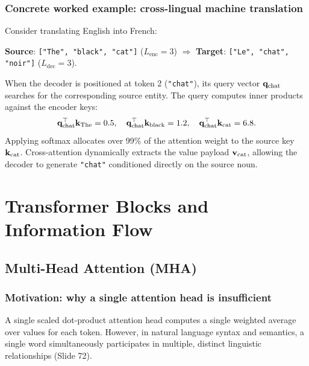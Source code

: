 \documentclass[../../../main.tex]{subfiles}
\begin{document}
\subsubsection{Concrete worked example: cross-lingual machine translation}
Consider translating English into French:
\begin{center}
\textbf{Source}: \texttt{["The", "black", "cat"]} ($L_{\text{enc}} = 3$) \quad $\Longrightarrow$ \quad \textbf{Target}: \texttt{["Le", "chat", "noir"]} ($L_{\text{dec}} = 3$).
\end{center}
When the decoder is positioned at token 2 (\texttt{"chat"}), its query vector $\mathbf{q}_{\text{chat}}$ searches for the corresponding source entity. The query computes inner products against the encoder keys:
\begin{equation}
\mathbf{q}_{\text{chat}}^\top \mathbf{k}_{\text{The}} = 0.5, \quad \mathbf{q}_{\text{chat}}^\top \mathbf{k}_{\text{black}} = 1.2, \quad \mathbf{q}_{\text{chat}}^\top \mathbf{k}_{\text{cat}} = 6.8.
\end{equation}
Applying softmax allocates over 99\% of the attention weight to the source key $\mathbf{k}_{\text{cat}}$. Cross-attention dynamically extracts the value payload $\mathbf{v}_{\text{cat}}$, allowing the decoder to generate \texttt{"chat"} conditioned directly on the source noun.

\clearpage
\section{Transformer Blocks and Information Flow}
\label{sec:transformer_core_blocks_journey}

\subsection{Multi-Head Attention (MHA)}
\label{subsec:multi_head_attention_deep}

\subsubsection{Motivation: why a single attention head is insufficient}
A single scaled dot-product attention head computes a single weighted average over values for each token. However, in natural language syntax and semantics, a single word simultaneously participates in multiple, distinct linguistic relationships (Slide 72).
\end{document}
